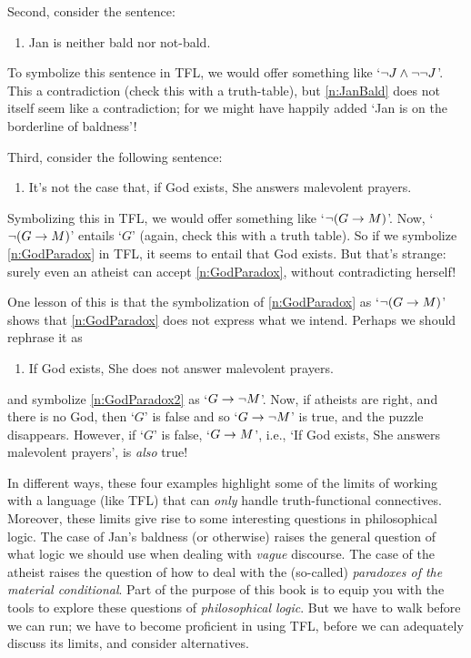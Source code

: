 Second, consider the sentence:
	\begin{enumerate}
		\item\label{n:JanBald} Jan is neither bald nor not-bald.
	\end{enumerate}
To symbolize this sentence in TFL, we would offer something like `$\neg J \wedge \neg \neg J$'. This a contradiction (check this with a truth-table), but \cref*{n:JanBald} does not itself seem like a contradiction; for we might have happily added `Jan is on the borderline of baldness'!

Third, consider the following sentence:
	\begin{enumerate}
	\item\label{n:GodParadox}	It's not the case that, if God exists, She answers malevolent prayers.
	\end{enumerate}
Symbolizing this in TFL, we would offer something like `$\neg (G \rightarrow M)$'. Now, `$\neg (G \rightarrow M)$' entails `$G$' (again, check this with a truth table). So if we symbolize \cref*{n:GodParadox} in TFL, it seems to entail that God exists. But that's strange: surely even an atheist can accept \cref*{n:GodParadox}, without contradicting herself!

One lesson of this is that the symbolization of \cref*{n:GodParadox} as `$\neg(G \rightarrow M)$' shows that \cref*{n:GodParadox} does not express what we intend. Perhaps we should rephrase it as
	\begin{enumerate}
	\item\label{n:GodParadox2} If God exists, She does not answer malevolent prayers.
	\end{enumerate}
and symbolize \cref*{n:GodParadox2} as `$G \rightarrow \neg M$'.  Now, if atheists are right, and there is no God, then `$G$' is false and so `$G \rightarrow \neg M$' is true, and the puzzle disappears. However, if `$G$' is false, `$G \rightarrow M$', i.e., `If God exists, She answers malevolent prayers', is \emph{also} true!
                
In different ways, these four examples highlight some of the limits of working with a language (like TFL) that can \emph{only} handle truth-functional connectives. Moreover, these limits give rise to some interesting questions in philosophical logic. The case of Jan's baldness (or otherwise) raises the general question of what logic we should use when dealing with \emph{vague} discourse. The case of the atheist raises the question of how to deal with the (so-called) \emph{paradoxes of the material conditional}. Part of the purpose of this book is to equip you with the tools to explore these questions of \emph{philosophical logic}. But we have to walk before we can run; we have to become proficient in using TFL, before we can adequately discuss its limits, and consider alternatives.


